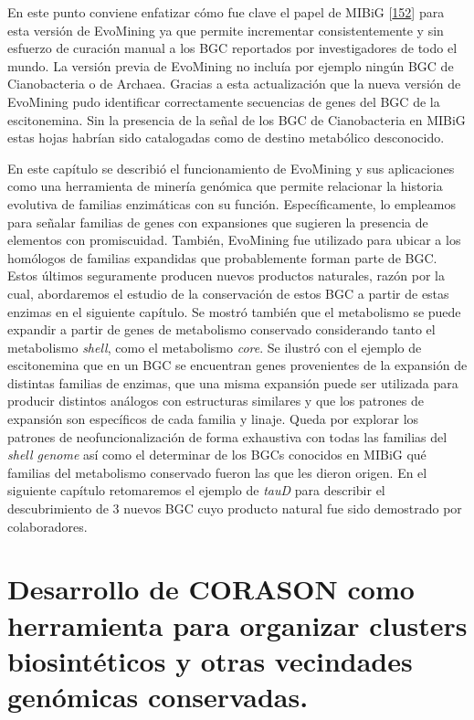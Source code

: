 \documentclass[12pt,twoside]{reedthesis}
\begin{document}
  En este punto conviene enfatizar cómo fue clave el papel de MIBiG
  {[}\protect\hyperlink{ref-medema_minimum_2015}{152}{]} para esta versión
  de EvoMining ya que permite incrementar consistentemente y sin esfuerzo
  de curación manual a los BGC reportados por investigadores de todo el
  mundo. La versión previa de EvoMining no incluía por ejemplo ningún BGC
  de Cianobacteria o de Archaea. Gracias a esta actualización que la nueva
  versión de EvoMining pudo identificar correctamente secuencias de genes
  del BGC de la escitonemina. Sin la presencia de la señal de los BGC de
  Cianobacteria en MIBiG estas hojas habrían sido catalogadas como de
  destino metabólico desconocido.
  
  En este capítulo se describió el funcionamiento de EvoMining y sus
  aplicaciones como una herramienta de minería genómica que permite
  relacionar la historia evolutiva de familias enzimáticas con su función.
  Específicamente, lo empleamos para señalar familias de genes con
  expansiones que sugieren la presencia de elementos con promiscuidad.
  También, EvoMining fue utilizado para ubicar a los homólogos de familias
  expandidas que probablemente forman parte de BGC. Estos últimos
  seguramente producen nuevos productos naturales, razón por la cual,
  abordaremos el estudio de la conservación de estos BGC a partir de estas
  enzimas en el siguiente capítulo. Se mostró también que el metabolismo
  se puede expandir a partir de genes de metabolismo conservado
  considerando tanto el metabolismo \emph{shell}, como el metabolismo
  \emph{core}. Se ilustró con el ejemplo de escitonemina que en un BGC se
  encuentran genes provenientes de la expansión de distintas familias de
  enzimas, que una misma expansión puede ser utilizada para producir
  distintos análogos con estructuras similares y que los patrones de
  expansión son específicos de cada familia y linaje. Queda por explorar
  los patrones de neofuncionalización de forma exhaustiva con todas las
  familias del \emph{shell genome} así como el determinar de los BGCs
  conocidos en MIBiG qué familias del metabolismo conservado fueron las
  que les dieron origen. En el siguiente capítulo retomaremos el ejemplo
  de \emph{tauD} para describir el descubrimiento de 3 nuevos BGC cuyo
  producto natural fue sido demostrado por colaboradores.
  
  \chapter{Desarrollo de CORASON como herramienta para organizar clusters
  biosintéticos y otras vecindades genómicas
  conservadas.}\label{desarrollo-de-corason-como-herramienta-para-organizar-clusters-biosinteticos-y-otras-vecindades-genomicas-conservadas.}
  
\end{document}
